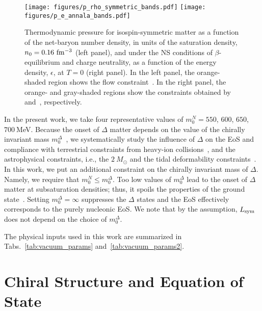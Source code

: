 \documentclass[preprint,showkeys,lengthcheck,nofootinbib,twocolumn,notitlepage,floatfix,superscriptaddress]{revtex4-1}
\begin{document}
\begin{figure*}[t!]
  \centering
  \texttt{[image: figures/p\_rho\_symmetric\_bands.pdf]}\;\;\;\;
  \texttt{[image: figures/p\_e\_annala\_bands.pdf]}
  \caption{Thermodynamic pressure for isospin-symmetric matter as a function of the net-baryon number density, in units of the saturation density, $n_0=0.16~\rm fm^{-3}$ (left panel), and under the NS conditions of $\beta$-equilibrium and charge neutrality, as a function of the energy density, $\epsilon$, at $T=0$ (right panel). In the left panel, the orange-shaded region shows the flow constraint~\cite{Danielewicz:2002pu}. In the right panel, the orange- and gray-shaded regions show the constraints obtained by~\cite{Annala:2019puf} and~\cite{Abbott:2018exr}, respectively.}
  \label{fig:pressure}
\end{figure*}

In the present work, we take four representative values of $m_0^N=550$, $600$, $650$, $700~$MeV. Because the onset of $\Delta$ matter depends on the value of the chirally invariant mass $m_0^\Delta$~\cite{Takeda:2017mrm}, we systematically study the influence of $\Delta$ on the EoS and compliance with terrestrial constraints from heavy-ion collisions~\cite{Danielewicz:2002pu}, and the astrophysical constraints, i.e., the $2~M_\odot$ and the tidal deformability constraints~\cite{Hebeler:2013nza, Cromartie:2019kug, Fonseca:2021wxt, Abbott:2018exr}. In this work, we put an additional constraint on the chirally invariant mass of $\Delta$. Namely, we require that $m_0^N \leq m_0^\Delta$. Too low values of $m_0^\Delta$ lead to the onset of $\Delta$ matter at subsaturation densities; thus, it spoils the properties of the ground state~\cite{Takeda:2017mrm}.  Setting $m_0^\Delta = \infty$ suppresses the $\Delta$ states and the EoS effectively corresponds to the purely nucleonic EoS. We note that by  the assumption, $L_{\rm sym}$ does not depend on the choice of $m_0^\Delta$.
 
The physical inputs used in this work are summarized in Tabs.~\ref{tab:vacuum_params} and~\ref{tab:vacuum_params2}. 



\section{Chiral Structure and Equation of State}
\label{sec:eos}
\end{document}
